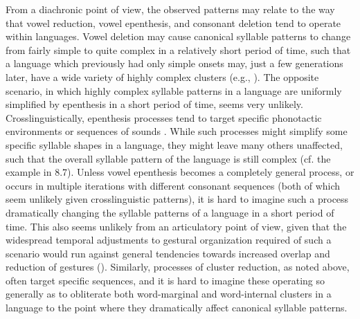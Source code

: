   From a diachronic point of view, the observed patterns may relate to the way that vowel reduction, vowel epenthesis, and consonant deletion tend to operate within languages. Vowel deletion may cause canonical syllable patterns to change from fairly simple to quite complex in a relatively short period of time, such that a language which previously had only simple onsets may, just a few generations later, have a wide variety of highly complex clusters (e.g., ). The opposite scenario, in which highly complex syllable patterns in a language are uniformly simplified by epenthesis in a short period of time, seems very unlikely. Crosslinguistically, epenthesis processes tend to target specific phonotactic environments or sequences of sounds \citep{Hall2011}. While such processes might simplify some specific syllable shapes in a language, they might leave many others unaffected, such that the overall syllable pattern of the language is still complex (cf. the  example in 8.7). Unless vowel epenthesis becomes a completely general process, or occurs in multiple iterations with different consonant sequences (both of which seem unlikely given crosslinguistic patterns), it is hard to imagine such a process dramatically changing the syllable patterns of a language in a short period of time. This also seems unlikely from an articulatory point of view, given that the widespread temporal adjustments to gestural organization required of such a scenario would run against general tendencies towards increased overlap and reduction of gestures (\citealt{BrowmanGoldstein1992b}). Similarly, processes of cluster reduction, as noted above, often target specific sequences, and it is hard to imagine these operating so generally as to obliterate both word-marginal and word-internal clusters in a language to the point where they dramatically affect canonical syllable patterns. 

